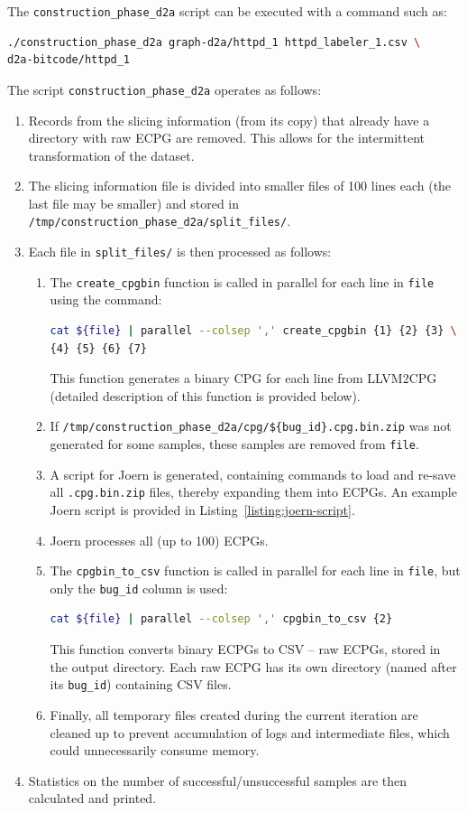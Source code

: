 The \texttt{construction\_phase\_d2a} script can be executed with a command such as:
\begin{lstlisting}[language=bash, xleftmargin=2em]
./construction_phase_d2a graph-d2a/httpd_1 httpd_labeler_1.csv \
d2a-bitcode/httpd_1
\end{lstlisting}

The script \texttt{construction\_phase\_d2a} operates as follows:
\begin{enumerate}
    \item Records from the slicing information (from its copy) that already have a directory with raw ECPG are removed. This allows for the intermittent transformation of the dataset.
    \item The slicing information file is divided into smaller files of 100 lines each (the last file may be smaller) and stored in \texttt{/tmp/construction\_phase\_d2a/split\_files/}.
    \item Each file in \texttt{split\_files/} is then processed as follows:
    \begin{enumerate}
        \item The \texttt{create\_cpgbin} function is called in parallel for each line in \texttt{file} using the command:
\begin{lstlisting}[language=bash, xleftmargin=1em]
cat ${file} | parallel --colsep ',' create_cpgbin {1} {2} {3} \
{4} {5} {6} {7}
\end{lstlisting}
        This function generates a binary CPG for each line from LLVM2CPG (detailed description of this function is provided below).
        \item If \texttt{/tmp/construction\_phase\_d2a/cpg/\$\{bug\_id\}.cpg.bin.zip} was not generated for some samples, these samples are removed from \texttt{file}.
        \item A script for Joern is generated, containing commands to load and re-save all \texttt{.cpg.bin.zip} files, thereby expanding them into ECPGs. An example Joern script is provided in Listing~\ref{listing:joern-script}.
        \item Joern processes all (up to 100) ECPGs.
        \item The \texttt{cpgbin\_to\_csv} function is called in parallel for each line in \texttt{file}, but only the \texttt{bug\_id} column is used:
\begin{lstlisting}[language=bash, xleftmargin=1em]
cat ${file} | parallel --colsep ',' cpgbin_to_csv {2}
\end{lstlisting}
        This function converts binary ECPGs to CSV -- raw ECPGs, stored in the output directory. Each raw ECPG has its own directory (named after its \texttt{bug\_id}) containing CSV files.
        \item Finally, all temporary files created during the current iteration are cleaned up to prevent accumulation of logs and intermediate files, which could unnecessarily consume memory.
    \end{enumerate}
    \item Statistics on the number of successful/unsuccessful samples are then calculated and printed.
\end{enumerate}

